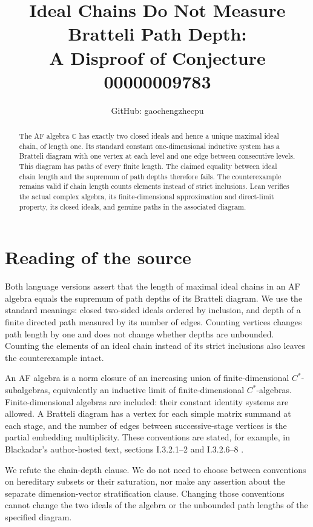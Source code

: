 \documentclass[11pt]{article}
\title{Ideal Chains Do Not Measure Bratteli Path Depth:\\A Disproof of Conjecture 00000009783}
\author{GitHub: gaochengzhecpu}
\date{}
\begin{document}
\maketitle
\begin{abstract}
The AF algebra $\mathbb C$ has exactly two closed ideals and hence a
unique maximal ideal chain, of length one. Its standard constant
one-dimensional inductive system has a Bratteli diagram with one vertex
at each level and one edge between consecutive levels. This diagram
has paths of every finite length. The claimed equality between ideal
chain length and the supremum of path depths therefore fails. The
counterexample remains valid if chain length counts elements instead
of strict inclusions. Lean verifies the actual complex algebra, its
finite-dimensional approximation and direct-limit property, its closed
ideals, and genuine paths in the associated diagram.
\end{abstract}

\section*{Reading of the source}
Both language versions assert that the length of maximal ideal chains
in an AF algebra equals the supremum of path depths of its Bratteli
diagram. We use the standard meanings: closed two-sided ideals ordered
by inclusion, and depth of a finite directed path measured by its
number of edges. Counting vertices changes path length by one and
does not change whether depths are unbounded. Counting the elements
of an ideal chain instead of its strict inclusions also leaves the
counterexample intact.

An AF algebra is a norm closure of an increasing union of
finite-dimensional $C^*$-subalgebras, equivalently an inductive limit
of finite-dimensional $C^*$-algebras. Finite-dimensional algebras are
included: their constant identity systems are allowed. A Bratteli
diagram has a vertex for each simple matrix summand at each stage,
and the number of edges between successive-stage vertices is the
partial embedding multiplicity. These conventions are stated, for
example, in Blackadar's author-hosted text, sections I.3.2.1--2 and I.3.2.6--8
\cite{blackadar}.

We refute the chain-depth clause. We do not need to choose between
conventions on hereditary subsets or their saturation, nor make any
assertion about the separate dimension-vector stratification clause.
Changing those conventions cannot change the two ideals of the
algebra or the unbounded path lengths of the specified diagram.
\end{document}
